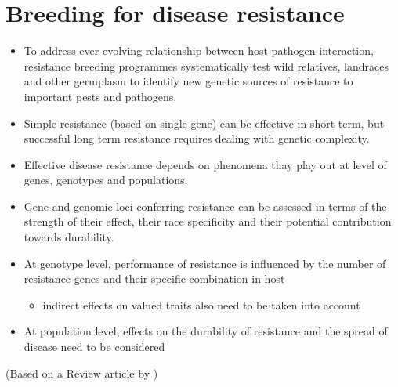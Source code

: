 \documentclass[11pt,dvipsnames,ignorenonframetext,aspectratio=169]{beamer}
\providecommand{\tightlist}{%
  \setlength{\itemsep}{0pt}\setlength{\parskip}{0pt}}
\begin{document}
\hypertarget{breeding-for-disease-resistance}{%
\section{Breeding for disease
resistance}\label{breeding-for-disease-resistance}}

\begin{frame}{}
\protect\hypertarget{section-22}{}
\small

\begin{itemize}
\tightlist
\item
  To address ever evolving relationship between host-pathogen
  interaction, resistance breeding programmes systematically test wild
  relatives, landraces and other germplasm to identify new genetic
  sources of resistance to important pests and pathogens.
\item
  Simple resistance (based on single gene) can be effective in short
  term, but successful long term resistance requires dealing with
  genetic complexity.
\item
  Effective disease resistance depends on phenomena thay play out at
  level of genes, genotypes and populations.
\item
  Gene and genomic loci conferring resistance can be assessed in terms
  of the strength of their effect, their race specificity and their
  potential contribution towards durability.
\item
  At genotype level, performance of resistance is influenced by the
  number of resistance genes and their specific combination in host

  \begin{itemize}
  \tightlist
  \item
    indirect effects on valued traits also need to be taken into account
  \end{itemize}
\item
  At population level, effects on the durability of resistance and the
  spread of disease need to be considered
\end{itemize}

(\footnotesize Based on a Review article by
\citet{nelson2018navigating})
\end{frame}
\end{document}
